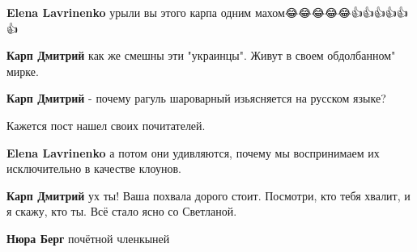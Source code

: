 \begin{itemize}
\begin{itemize}
\textbf{Elena Lavrinenko} урыли вы этого карпа одним махом😂😂😂😂😂👍👍👍👍👍👍

 
\textbf{Карп Дмитрий} как же смешны эти "украинцы". Живут в своем обдолбанном" мирке.

 
\textbf{Карп Дмитрий} - почему рагуль шароварный изьясняется на русском языке?

 
Кажется пост нашел своих почитателей.

 
\textbf{Elena Lavrinenko} а потом они удивляются, почему мы воспринимаем их исключительно в качестве клоунов.

 
\textbf{Карп Дмитрий} ух ты! Ваша похвала дорого стоит. Посмотри, кто тебя хвалит, и я скажу, кто ты. Всё стало ясно со Светланой.

 
\textbf{Нюра Берг} почётной членкыней

 

\end{itemize}
\end{itemize}

